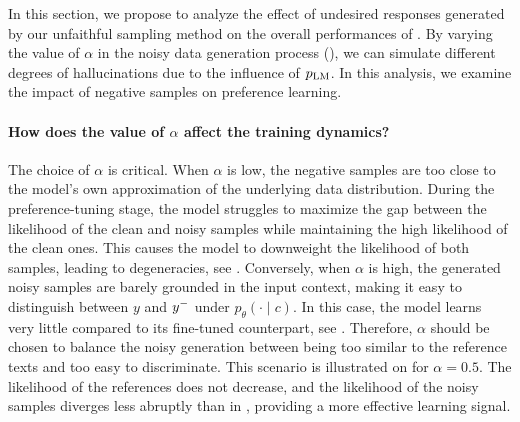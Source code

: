 In this section, we propose to analyze the effect of undesired responses generated by our unfaithful sampling method on the overall performances of \scope. By varying the value of $\alpha$ in the noisy data generation process (), we can simulate different degrees of hallucinations due to the influence of $p_{\text{LM}}$. In this analysis, we examine the impact of negative samples on preference learning.




\paragraph{How does the value of $\alpha$ affect the training dynamics?}
\label{sec:alpha-effect}
The choice of $\alpha$ is critical. When $\alpha$ is low, the negative samples are too close to the model's own approximation of the underlying data distribution. During the preference-tuning stage, the model struggles to maximize the gap between the likelihood of the clean and noisy samples while maintaining the high likelihood of the clean ones. This causes the model to downweight the likelihood of both samples, leading to degeneracies, see .
Conversely, when $\alpha$ is high, the generated noisy samples are barely grounded in the input context, making it easy to distinguish between $y$ and $y^-$ under $p_\theta(\cdot \mid c)$. In this case, the model learns very little compared to its fine-tuned counterpart, see . Therefore, $\alpha$ should be chosen to balance the noisy generation between being too similar to the reference texts and too easy to discriminate. This scenario is illustrated on  for $\alpha=0.5$. The likelihood of the references does not decrease, and the likelihood of the noisy samples diverges less abruptly than in , providing a more effective learning signal.

